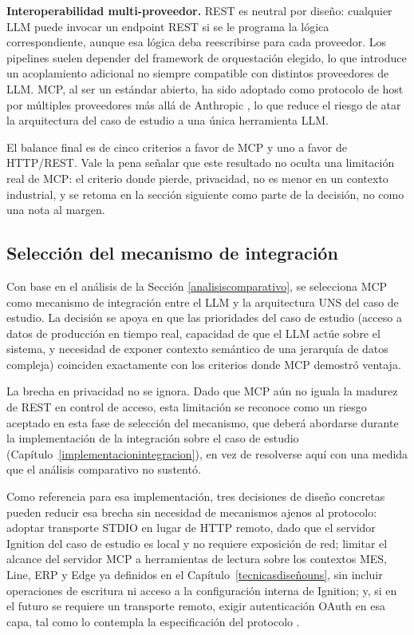 \textbf{Interoperabilidad multi-proveedor.} REST es neutral por diseño: cualquier LLM puede invocar un endpoint REST si se le programa la lógica correspondiente, aunque esa lógica deba reescribirse para cada proveedor. Los pipelines suelen depender del framework de orquestación elegido, lo que introduce un acoplamiento adicional no siempre compatible con distintos proveedores de LLM. MCP, al ser un estándar abierto, ha sido adoptado como protocolo de host por múltiples proveedores más allá de Anthropic \cite{EhteshamAgentProtocols2025}, lo que reduce el riesgo de atar la arquitectura del caso de estudio a una única herramienta LLM.

El balance final es de cinco criterios a favor de MCP y uno a favor de HTTP/REST. Vale la pena señalar que este resultado no oculta una limitación real de MCP: el criterio donde pierde, privacidad, no es menor en un contexto industrial, y se retoma en la sección siguiente como parte de la decisión, no como una nota al margen.

\subsection{Selección del mecanismo de integración}
\label{seleccionmecanismo}

Con base en el análisis de la Sección \ref{analisiscomparativo}, se selecciona MCP como mecanismo de integración entre el LLM y la arquitectura UNS del caso de estudio. La decisión se apoya en que las prioridades del caso de estudio (acceso a datos de producción en tiempo real, capacidad de que el LLM actúe sobre el sistema, y necesidad de exponer contexto semántico de una jerarquía de datos compleja) coinciden exactamente con los criterios donde MCP demostró ventaja.

La brecha en privacidad no se ignora. Dado que MCP aún no iguala la madurez de REST en control de acceso, esta limitación se reconoce como un riesgo aceptado en esta fase de selección del mecanismo, que deberá abordarse durante la implementación de la integración sobre el caso de estudio (Capítulo~\ref{implementacionintegracion}), en vez de resolverse aquí con una medida que el análisis comparativo no sustentó.

Como referencia para esa implementación, tres decisiones de diseño concretas pueden reducir esa brecha sin necesidad de mecanismos ajenos al protocolo: adoptar transporte STDIO en lugar de HTTP remoto, dado que el servidor Ignition del caso de estudio es local y no requiere exposición de red; limitar el alcance del servidor MCP a herramientas de lectura sobre los contextos MES, Line, ERP y Edge ya definidos en el Capítulo~\ref{tecnicasdiseñouns}, sin incluir operaciones de escritura ni acceso a la configuración interna de Ignition; y, si en el futuro se requiere un transporte remoto, exigir autenticación OAuth en esa capa, tal como lo contempla la especificación del protocolo \cite{anthropic2024arch}.

